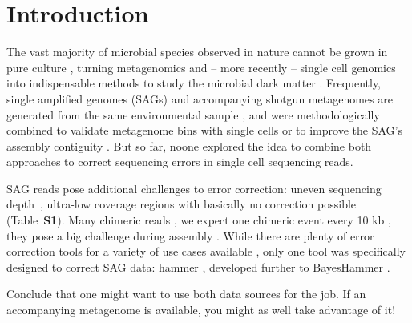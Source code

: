 \documentclass{bioinfo}
\begin{document}
\vspace{-1em}

\section{Introduction}

The vast majority of microbial species observed in nature cannot be grown in pure culture \citep{rappe}, turning metagenomics and -- more recently -- single cell genomics into indispensable methods to study the microbial dark matter \citep{mdm}.
Frequently, single amplified genomes (SAGs) and accompanying shotgun metagenomes are generated from the same environmental sample \citep{mason, op9}, and were methodologically combined to validate metagenome bins with single cells \citep{cowrumen} or to improve the SAG's assembly contiguity \citep{sr1}.
But so far, noone explored the idea to combine both approaches to correct sequencing errors in single cell sequencing reads.

SAG reads pose additional challenges to error correction: uneven sequencing depth~\citep{chitsaz}, ultra-low coverage regions with basically no correction possible (Table~\textbf{S1}). %
Many chimeric reads \citep{lasken}, we expect one chimeric event every 10 kb \citep{rodrigue}, they pose a big challenge during assembly \citep{spades2}.
While there are plenty of error correction tools for a variety of use cases available \citep{david}, only one tool was specifically designed to correct SAG data: hammer \citep{hammer}, developed further to BayesHammer \citep{bayeshammer}.

Conclude that one might want to use both data sources for the job. If an accompanying metagenome is available, you might as well take advantage of it!

\vspace{-1em}
\end{document}
